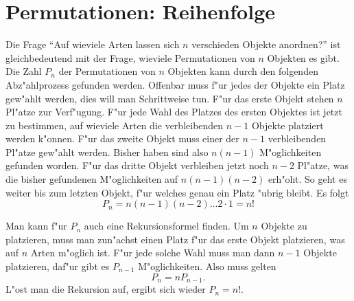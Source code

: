 \section{Permutationen: Reihenfolge} \label{kombinatorik-permutation}
Die Frage ``Auf wieviele Arten lassen sich $n$ verschieden Objekte anordnen?''
ist gleichbedeutend mit der Frage, wieviele Permutationen von $n$
Objekten es gibt. Die Zahl  $P_n$ der Permutationen von $n$ Objekten
kann durch den folgenden Abz"ahlprozess gefunden werden. Offenbar
muss f"ur jedes der Objekte ein Platz gew"ahlt werden, dies will
man Schrittweise tun. F"ur das erste Objekt stehen $n$ Pl"atze
zur Verf"ugung. F"ur jede Wahl des Platzes des ersten Objektes 
ist jetzt zu bestimmen, auf wieviele Arten die verbleibenden
$n-1$ Objekte platziert werden k"onnen. F"ur das zweite
Objekt muss einer der $n-1$ verbleibenden Pl"atze gew"ahlt werden.
Bisher haben sind also $n(n-1)$ M"oglichkeiten gefunden worden.
F"ur das dritte Objekt verbleiben jetzt noch $n-2$ Pl"atze,
was die bisher gefundenen M"oglichkeiten auf $n(n-1)(n-2)$
erh"oht. So geht es weiter bis zum letzten Objekt, f"ur welches
genau ein Platz "ubrig bleibt. Es folgt
\[
P_n=n(n-1)(n-2)\dots 2\cdot 1=n!
\]

Man kann f"ur $P_n$ auch eine Rekursionsformel finden. Um $n$ Objekte
zu platzieren, muss man zun"achst einen Platz f"ur das erste Objekt
platzieren, was auf $n$ Arten m"oglich ist. F"ur jede solche Wahl
muss man dann $n-1$ Objekte platzieren, daf"ur gibt es $P_{n-1}$
M"oglichkeiten. Also muss gelten
\[
P_n=nP_{n-1}.
\]
L"ost man die Rekursion auf, ergibt sich wieder $P_n=n!$.


